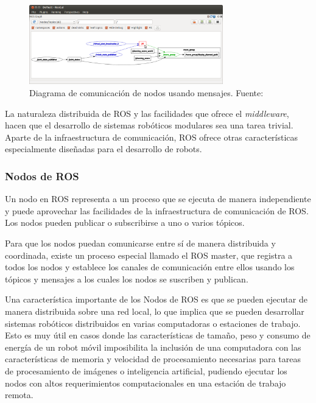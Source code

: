         \begin{figure}[!h] 
            \centering
            \includegraphics[width=0.75\textwidth]{img/rqtgraph}
            \caption[Diagrama de comunicación de nodos]{Diagrama de comunicación de nodos usando mensajes. Fuente: \cite{roswiki} }
            \label{fig:rqtgraph}
        \end{figure}

        La naturaleza distribuida de ROS y las facilidades que ofrece el \textit{middleware}, hacen que el desarrollo de sistemas 
        robóticos modulares sea una tarea trivial. Aparte de la infraestructura de comunicación, ROS ofrece otras características
        especialmente diseñadas para el desarrollo de robots.
        
        \subsubsection{Nodos de ROS}
        Un nodo en ROS representa a un proceso que se ejecuta de manera independiente y puede aprovechar las facilidades 
        de la infraestructura de comunicación de ROS. Los nodos pueden publicar o subscribirse a uno o varios tópicos. 

        Para que los nodos puedan comunicarse entre sí de manera distribuida y coordinada, existe un proceso especial llamado 
        el ROS master, que registra a todos los nodos y establece los canales de comunicación entre ellos usando los tópicos 
        y mensajes a los cuales los nodos se suscriben y publican. 

        Una característica importante de los Nodos de ROS es que se pueden ejecutar de manera distribuida sobre una red local, 
        lo que implica que se pueden desarrollar sistemas robóticos distribuidos en varias computadoras o estaciones de trabajo. 
        Esto es muy útil en casos donde las características de tamaño, peso y consumo de energía de un robot móvil imposibilita 
        la inclusión de una computadora con las características de memoria y velocidad de procesamiento necesarias para tareas 
        de procesamiento de imágenes o inteligencia artificial, pudiendo ejecutar los nodos con altos requerimientos computacionales 
        en una estación de trabajo remota.

